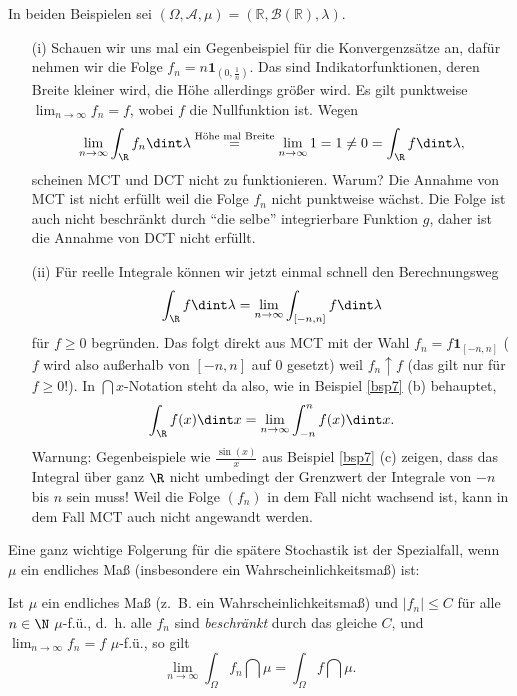 \begin{beispiel1}
	In beiden Beispielen sei $(\Omega, \mathcal A, \mu)=(\mathbb R, \mathcal B(\mathbb R), \lambda)$.
	\begin{itemize}
		\item[(i)] Schauen wir uns mal ein Gegenbeispiel f\"ur die Konvergenzs\"atze an, daf\"ur nehmen wir die Folge $f_n= n \mathbf 1_{(0,\frac 1 n)}$. Das sind Indikatorfunktionen, deren Breite kleiner wird, die H\"ohe allerdings gr\"o\ss er wird. Es gilt punktweise $\lim_{n\to\infty} f_n=f$, wobei $f$ die Nullfunktion ist. Wegen 
		\begin{align*}
			\lim_{n\to\infty} \int_\R f_n\dint \lambda\overset{\text{H\"ohe mal Breite}}{=} \lim_{n\to\infty} 1 =1\neq 0=\int_\R f\dint \lambda,
		\end{align*}
		scheinen MCT und DCT nicht zu funktionieren. Warum? Die Annahme von MCT ist nicht erf\"ullt weil die Folge $f_n$ nicht punktweise w\"achst. Die Folge ist auch nicht beschr\"ankt durch \enquote{die selbe} integrierbare Funktion $g$, daher ist die Annahme von DCT nicht erf\"ullt.		
		\item[(ii)] F\"ur reelle Integrale k\"onnen wir jetzt einmal schnell den Berechnungsweg  
\begin{align*}
	\int_\R f \dint \lambda= \lim_{n\to\infty} \int_{[-n,n]} f\dint \lambda
\end{align*}
f\"ur $f\geq 0$ begr\"unden. Das folgt direkt aus MCT mit der Wahl $f_n=f \mathbf 1_{[-n,n]}$ ($f$ wird also au\ss erhalb von $[-n,n]$ auf $0$ gesetzt) weil $f_n\uparrow f$ (das gilt nur f\"ur $f\geq 0$!). In $\dint x$-Notation steht da also, wie in Beispiel \ref{bsp7} (b) behauptet,
\begin{align*}
	\int_\R f(x)\dint x= \lim_{n\to\infty} \int_{-n}^n f(x)\dint x.
\end{align*}
Warnung: Gegenbeispiele wie $\frac{\sin(x)}{x}$ aus Beispiel \ref{bsp7} (c) zeigen, dass das Integral \"uber ganz $\R$ nicht umbedingt der Grenzwert der Integrale von $-n$ bis $n$ sein muss! Weil die Folge $(f_n)$ in dem Fall nicht wachsend ist, kann in dem Fall MCT auch nicht angewandt werden.\smallskip	\end{itemize}
\end{beispiel1}


Eine ganz wichtige Folgerung f\"ur die sp\"atere Stochastik ist der Spezialfall, wenn $\mu$ ein endliches Ma\ss{} (insbesondere ein Wahrscheinlichkeitsma\ss ) ist:
\begin{korollar}\label{K7}
	Ist $\mu$ ein endliches Maß (\mbox{z. B.} ein Wahrscheinlichkeitsmaß) und $|f_n| \leq C$ für alle $n \in \N$ $\mu$-f.\"u., \mbox{d. h.} alle $f_n$ sind \textit{beschränkt} durch das gleiche $C$, und $\lim_{n\to\infty}f_n = f$ $\mu$-f.\"u., so gilt \[ \lim\limits_{n \to \infty} \int_{\Omega} f_n \dint \mu = \int_{\Omega} f \dint \mu. \]
\end{korollar}

